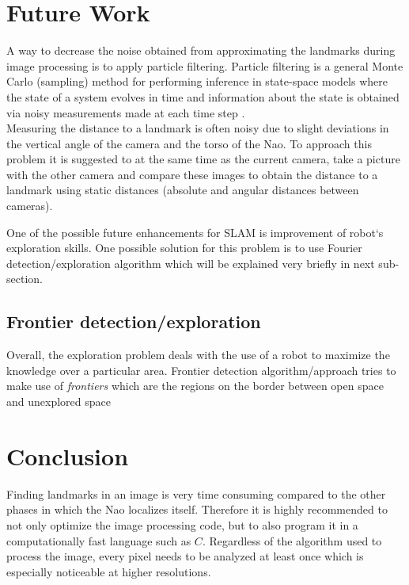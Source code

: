 \documentclass{ba-kecs}
\numberwithin{figure}{section}
\numberwithin{equation}{section}
\begin{document}

\section{Future Work}
	A way to decrease the noise obtained from approximating the landmarks during image processing is to apply particle filtering. Particle filtering is a general Monte Carlo (sampling) method for performing inference in
state-space models where the state of a system evolves in time and information about the state is obtained via noisy measurements made at each time step \cite{ParFil}. \\

	Measuring the distance to a landmark is often noisy due to slight deviations in the vertical angle of the camera and the torso of the Nao. To approach this problem it is suggested to at the same time as the current camera, take a picture with the other camera and compare these images to obtain the distance to a landmark using static distances (absolute and angular distances between cameras).
	
	One of the possible future enhancements for SLAM is improvement of robot`s exploration skills. One possible solution for this problem is to use Fourier detection/exploration algorithm which will be explained very briefly in next sub-section.
	
\subsection{Frontier detection/exploration}
	Overall, the exploration problem deals with the use of a robot to maximize the knowledge over a particular area. Frontier detection algorithm/approach tries to make use of \textit{frontiers} which are the regions on the border between open space and unexplored space \cite{frontier}


\section{Conclusion}

Finding landmarks in an image is very time consuming compared to the other phases in which the Nao localizes itself. Therefore it is highly recommended to not only optimize the image processing code, but to also program it in a computationally fast language such as $\textit{C}$. Regardless of the algorithm used to process the image, every pixel needs to be analyzed at least once which is especially noticeable at higher resolutions. \\
\end{document}
